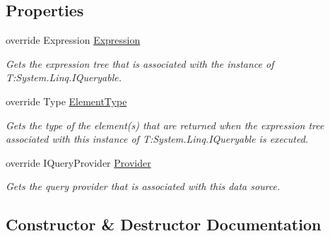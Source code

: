 \subsection*{Properties}
\begin{DoxyCompactItemize}
\item 
override Expression \hyperlink{classCqrs_1_1Azure_1_1BlobStorage_1_1BlobStorageStore_a8b3be7237234e7de532fccbfa6bbade8}{Expression}
\begin{DoxyCompactList}\small\item\em Gets the expression tree that is associated with the instance of T\+:\+System.\+Linq.\+I\+Queryable. \end{DoxyCompactList}\item 
override Type \hyperlink{classCqrs_1_1Azure_1_1BlobStorage_1_1BlobStorageStore_af4f4ed2c32ce521ebf164e63ef453b9c}{Element\+Type}
\begin{DoxyCompactList}\small\item\em Gets the type of the element(s) that are returned when the expression tree associated with this instance of T\+:\+System.\+Linq.\+I\+Queryable is executed. \end{DoxyCompactList}\item 
override I\+Query\+Provider \hyperlink{classCqrs_1_1Azure_1_1BlobStorage_1_1BlobStorageStore_acbc7f5a9d6eb9d1ece9a9035f185d4bf}{Provider}
\begin{DoxyCompactList}\small\item\em Gets the query provider that is associated with this data source. \end{DoxyCompactList}\end{DoxyCompactItemize}


\subsection{Constructor \& Destructor Documentation}
\mbox{\label{classCqrs_1_1Azure_1_1BlobStorage_1_1BlobStorageStore_ae1979c63b97dea8e207dda7b0087ee6b}} 
